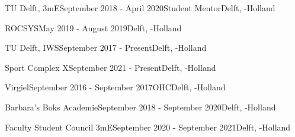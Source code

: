 \begin{rSection}{}
  \begin{experienceItem}
    {TU Delft, 3mE}{September 2018 - April 2020}{Student Mentor}{Delft, -Holland}
  \end{experienceItem}

  \begin{experienceItem}
    {ROCSYS}{May 2019 - August 2019}{}{Delft, -Holland}
  \end{experienceItem}

  \begin{experienceItem}
    {TU Delft, IWS}{September 2017 - Present}{}{Delft, -Holland}
  \end{experienceItem}

  \begin{experienceItem}
    {Sport Complex X}{September 2021 - Present}{}{Delft, -Holland}
  \end{experienceItem}

\end{rSection}


\begin{rSection}{}
  \begin{experienceItem}{Virgiel}{September 2016 - September 2017}{OHC}{Delft, -Holland}
  \end{experienceItem}

  \begin{experienceItem}{Barbara's Boks Academie}{September 2018 - September 2020}{}{Delft, -Holland}
  \end{experienceItem}

  \begin{experienceItem}
    {Faculty Student Council 3mE}{September 2020 - September 2021}{}{Delft, -Holland}
  \end{experienceItem}

\end{rSection}

